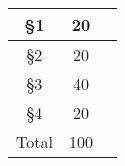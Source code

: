 \documentclass[12pt]{report}
\begin{document}
{\begin{center}
{\Large
\begin{tabular}{||c|c|r||} \hline 
  \S 1 & 20 &\hspace{10mm} \hfill \\ \hline 
  \S 2 & 20 &       \\ \hline
  \S 3 & 40 &      \\ \hline
  \S 4 &  20 &    \\ \hline
Total & 100 & \\ \hline 
\end{tabular}
}
\end{center}
}
\clearpage

\begin{titlepage}
\newpage
\mbox{}
\newpage
\end{titlepage}






%
\end{document}
